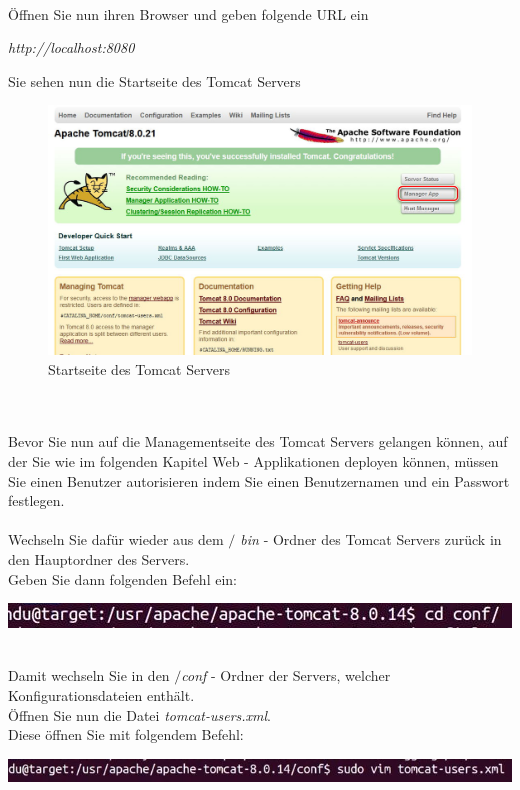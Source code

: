 \documentclass[a4paper, 12pt]{scrreprt}
\begin{document}
\ \\
Öffnen Sie nun ihren Browser und geben folgende URL ein
\begin{center}
	{\it http://localhost:8080}
\end{center}
Sie sehen nun die Startseite des Tomcat Servers\begin{figure}
\centering
\includegraphics[width=0.8\linewidth]{Grafiken/ServerStartPage}
\caption{Startseite des Tomcat Servers}
\label{fig:ServerStartPage1}
\end{figure}
\ \\
\newpage
\ \\
Bevor Sie nun  auf die Managementseite des Tomcat Servers gelangen können, auf der Sie wie im folgenden Kapitel Web - Applikationen deployen können, müssen Sie einen Benutzer autorisieren indem Sie einen Benutzernamen und ein Passwort festlegen.\ \\
\ \\
Wechseln Sie dafür wieder aus dem {\it $/$ bin} - Ordner des Tomcat Servers zurück in den Hauptordner des Servers.\\
Geben Sie dann folgenden Befehl ein:
\begin{center}
\includegraphics[width=0.7\linewidth]{Grafiken/conf-ordner}
\end{center}
\ \\
Damit wechseln Sie in den {\it $/$conf} - Ordner der Servers, welcher Konfigurationsdateien enthält.\\
Öffnen Sie nun die Datei {\it tomcat-users.xml}.\\
Diese öffnen Sie mit folgendem Befehl:
\begin{center}
\includegraphics[width=0.8\linewidth]{Grafiken/zomcat_users}
\end{center}
\end{document}
